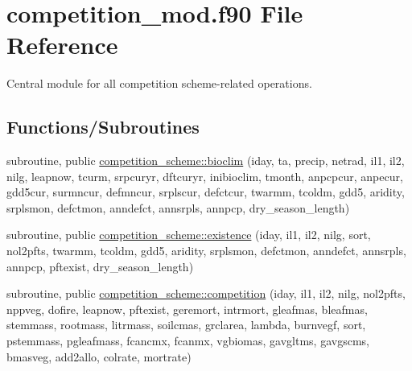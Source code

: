 \hypertarget{competition__mod_8f90}{}\section{competition\+\_\+mod.\+f90 File Reference}
\label{competition__mod_8f90}


Central module for all competition scheme-\/related operations.  


\subsection*{Functions/\+Subroutines}
{\bf }\par
\begin{DoxyCompactItemize}
\item 
subroutine, public \hyperlink{group__competition__scheme__bioclim_ga8976936d6f76c8619f6602153b8355f9}{competition\+\_\+scheme\+::bioclim} (iday, ta, precip, netrad, il1, il2, nilg, leapnow, tcurm, srpcuryr, dftcuryr, inibioclim, tmonth, anpcpcur, anpecur, gdd5cur, surmncur, defmncur, srplscur, defctcur, twarmm, tcoldm, gdd5, aridity, srplsmon, defctmon, anndefct, annsrpls, annpcp, dry\+\_\+season\+\_\+length)
\end{DoxyCompactItemize}

{\bf }\par
\begin{DoxyCompactItemize}
\item 
subroutine, public \hyperlink{group__competition__scheme__existence_ga4345a1807f52b8da4f0cdd9f0f71f91f}{competition\+\_\+scheme\+::existence} (iday, il1, il2, nilg, sort, nol2pfts, twarmm, tcoldm, gdd5, aridity, srplsmon, defctmon, anndefct, annsrpls, annpcp, pftexist, dry\+\_\+season\+\_\+length)
\end{DoxyCompactItemize}

{\bf }\par
\begin{DoxyCompactItemize}
\item 
subroutine, public \hyperlink{group__competition__scheme__competition_ga008cbfcefd33aaccb8f2b81cf8326451}{competition\+\_\+scheme\+::competition} (iday, il1, il2, nilg, nol2pfts, nppveg, dofire, leapnow, pftexist, geremort, intrmort, gleafmas, bleafmas, stemmass, rootmass, litrmass, soilcmas, grclarea, lambda, burnvegf, sort, pstemmass, pgleafmass, fcancmx, fcanmx, vgbiomas, gavgltms, gavgscms, bmasveg, add2allo, colrate, mortrate)
\end{DoxyCompactItemize}



